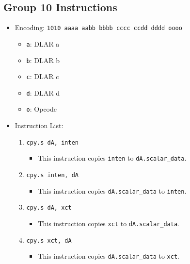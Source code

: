 \documentclass{article}
\begin{document}
	\subsection{Group 10 Instructions}
		\begin{itemize}
		\item Encoding: \texttt{1010 aaaa aabb bbbb  cccc ccdd dddd oooo}
			\begin{itemize}
			\item \texttt{a}: DLAR a
			\item \texttt{b}: DLAR b
			\item \texttt{c}: DLAR c
			\item \texttt{d}: DLAR d
			\item \texttt{o}: Opcode
			\end{itemize}
		\item Instruction List:
			\begin{enumerate}
			\item \texttt{cpy.s dA, inten}
				\begin{itemize}
				\item This instruction copies \texttt{inten} to
					\texttt{dA.scalar\_data}.
				\end{itemize}
			\item \texttt{cpy.s inten, dA}
				\begin{itemize}
				\item This instruction copies \texttt{dA.scalar\_data} to
					\texttt{inten}.
				\end{itemize}
			\item \texttt{cpy.s dA, xct}
				\begin{itemize}
				\item This instruction copies \texttt{xct} to
					\texttt{dA.scalar\_data}.
				\end{itemize}
			\item \texttt{cpy.s xct, dA}
				\begin{itemize}
				\item This instruction copies \texttt{dA.scalar\_data} to
					\texttt{xct}.
				\end{itemize}


\end{enumerate}
\end{itemize}
\end{document}
